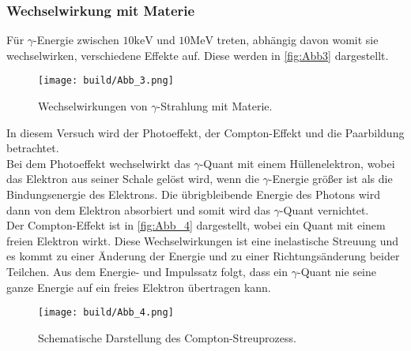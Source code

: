 \subsubsection{Wechselwirkung mit Materie}
\label{subsub:Wechselwirkung}
Für $\gamma$-Energie zwischen $10\si{\kilo\eV}$ und $10\si{\mega\eV}$ treten, abhängig davon womit sie wechselwirken,
verschiedene Effekte auf. Diese werden in \autoref{fig:Abb3} dargestellt.
\begin{figure}[H]
    \centering
    \texttt{[image: build/Abb\_3.png]}
    \caption {Wechselwirkungen von $\gamma$-Strahlung mit Materie\cite[233]{V704}.}
    \label{fig:Abb3}
\end{figure}
In diesem Versuch wird der Photoeffekt, der Compton-Effekt und die Paarbildung betrachtet.\\
Bei dem Photoeffekt wechselwirkt das $\gamma$-Quant mit einem Hüllenelektron, wobei das Elektron aus seiner Schale gelöst wird, wenn die 
$\gamma$-Energie größer ist als die Bindungsenergie des Elektrons.
Die übrigbleibende Energie des Photons wird dann von dem Elektron absorbiert und somit wird das $\gamma$-Quant vernichtet.\\
Der Compton-Effekt ist in \autoref{fig:Abb_4} dargestellt, wobei  ein Quant mit einem freien Elektron wirkt.
Diese Wechselwirkungen ist eine inelastische Streuung und es kommt zu einer Änderung der Energie und zu einer Richtungsänderung beider Teilchen.
Aus dem Energie- und Impulssatz folgt, dass ein $\gamma$-Quant nie seine ganze Energie auf ein freies Elektron übertragen kann.

\begin{figure}[H]
    \centering
    \texttt{[image: build/Abb\_4.png]}
    \caption {Schematische Darstellung des Compton-Streuprozess\cite[234]{V704}.}
    \label{fig:Abb_4}
\end{figure}


